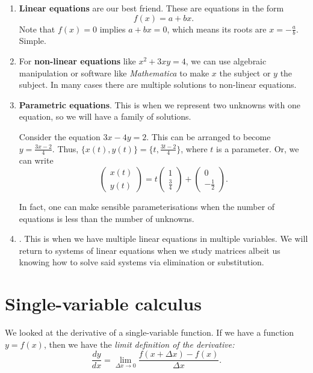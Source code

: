 \documentclass[a4paper, 12pt,oneside,openany]{book}
\begin{document}
\begin{enumerate}
	\item \textbf{Linear equations} are our best friend. These are equations in the form $$f(x) = a+bx.$$ Note that $f(x)=0$ implies $a+bx=0$, which means its roots are $x=-\frac{a}{b}$. Simple.

	\item For \textbf{non-linear equations} like $x^2+3xy=4$, we can use algebraic manipulation or software like \emph{Mathematica} to make $x$ the subject or $y$ the subject. In many cases there are multiple solutions to non-linear equations. 

	\item \textbf{Parametric equations}. This is when we represent two unknowns with one equation, so we will have a family of solutions. 
	
	Consider the equation $3x-4y=2$. This can be arranged to become $y = \frac{3x-2}{4}.$ Thus, $\{x(t), y(t)\} = \{t, \frac{3t-2}{4}\}$, where $t$ is a parameter. Or, we can write $$\begin{pmatrix} x(t) \\ y(t) \end{pmatrix} = t\begin{pmatrix} 1 \\ \frac{3}{4} \end{pmatrix} + \begin{pmatrix} 0 \\ -\frac{1}{2} \end{pmatrix}.$$
	
	In fact, one can make sensible parameterisations when the number of equations is less than the number of unknowns.
	
	\item {}. This is when we have multiple linear equations in multiple variables. We will return to systems of linear equations when we study matrices albeit us knowing how to solve said systems via elimination or substitution. 

\end{enumerate}


\section{Single-variable calculus}

We looked at the derivative of a single-variable function. If we have a function $y=f(x)$, then we have the \emph{limit definition of the derivative:} $$\frac{dy}{dx} = \lim\limits_{\Delta x \to 0} \frac{f(x+\Delta x) - f(x)}{\Delta x}.$$
\end{document}
